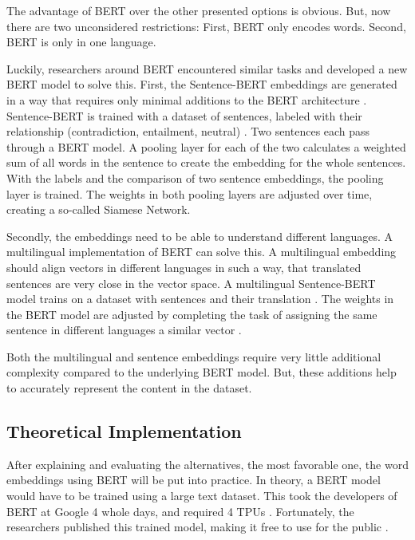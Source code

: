 			The advantage of BERT over the other presented options is obvious. But, now there are two unconsidered restrictions:
			First, BERT only encodes words.
			Second, BERT is only in one language.
			
			Luckily, researchers around BERT encountered similar tasks and developed a new BERT model to solve this. 
			First, the Sentence-BERT embeddings are generated in a way that requires only minimal additions to the BERT architecture \cite[p.~2]{sentenceBERT}. Sentence-BERT is trained with a dataset of sentences, labeled with their relationship (contradiction, entailment, neutral) \cite[p.~4]{sentenceBERT}. Two sentences each pass through a BERT model. A pooling layer for each of the two calculates a weighted sum of all words in the sentence to create the embedding for the whole sentences. With the labels and the comparison of two sentence embeddings, the pooling layer is trained. The weights in both pooling layers are adjusted over time, creating a so-called Siamese Network.
			
			Secondly, the embeddings need to be able to understand different languages. A multilingual implementation of BERT can solve this. A multilingual embedding should align vectors in different languages in such a way, that translated sentences are very close in the vector space. A multilingual Sentence-BERT model trains on a dataset with sentences and their translation \cite[p.~2]{mBERT}. The weights in the BERT model are adjusted by completing the task of assigning the same sentence in different languages a similar vector \cite[p.~2]{mBERT}.
			
			Both the multilingual and sentence embeddings require very little additional complexity compared to the underlying BERT model. But, these additions help to accurately represent the content in the dataset.
			
            \subsection{Theoretical Implementation}
            
           	After explaining and evaluating the alternatives, the most favorable one, the word embeddings using \ac{BERT} will be put into practice. In theory, a BERT model would have to be trained using a large text dataset. This took the developers of BERT at Google 4 whole days, and required 4 \ac{TPU}s \cite{BERTTraining}. Fortunately, the researchers published this trained model, making it free to use for the public \cite[p.~2]{BERT}.
            	
